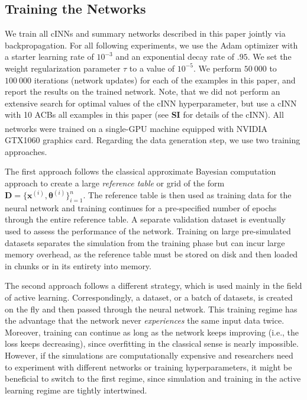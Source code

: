 \documentclass[9pt,twoside,lineno]{pnas-new}
\begin{document}
\subsection*{Training the Networks}
We train all cINNs and summary networks described in this paper jointly via backpropagation. For all following experiments, we use the Adam optimizer  with a starter learning rate of $10^{-3}$ and an exponential decay rate of $.95$. We set the weight regularization parameter $\tau$ to a value of $10^{-5}$. We perform $50\ 000$ to $100\ 000$ iterations (network updates) for each of the examples in this paper, and report the results on the trained network. Note, that we did not perform an extensive search for optimal values of the cINN hyperparameter, but use a cINN with 10 ACBs all examples in this paper (see \textbf{SI} for details of the cINN). All networks were trained on a single-GPU machine equipped with NVIDIA\textsuperscript{\textregistered} GTX1060 graphics card. Regarding the data generation step, we use two training approaches. 

The first approach follows the classical approximate Bayesian computation approach to create a large \textit{reference table} or grid of the form $\boldsymbol{D} = \{\boldsymbol{x}^{(i)}, \boldsymbol{\theta}^{(i)}\}_{i=1}^{n}$. The reference table is then used as training data for the neural network and training continues for a pre-specified number of epochs through the entire reference table. A separate validation dataset is eventually used to assess the performance of the network. Training on large pre-simulated datasets separates the simulation from the training phase but can incur large memory overhead, as the reference table must be stored on disk and then loaded in chunks or in its entirety into memory. 

The second approach follows a different strategy, which is used mainly in the field of active learning. Correspondingly, a dataset, or a batch of datasets, is created on the fly and then passed through the neural network. This training regime has the advantage that the network never \textit{experiences} the same input data twice. Moreover, training can continue as long as the network keeps improving (i.e., the loss keeps decreasing), since overfitting in the classical sense is nearly impossible. However, if the simulations are computationally expensive and researchers need to experiment with different networks or training hyperparameters, it might be beneficial to switch to the first regime, since simulation and training in the active learning regime are tightly intertwined.
\end{document}

